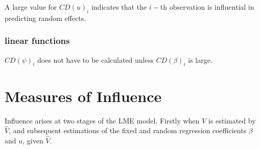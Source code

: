 \documentclass[12pt, a4paper]{report}
\begin{document}
A large value for $CD(u)_i$ indicates that the $i-$th observation is influential in predicting random effects.

\subsubsection{linear functions}

$CD(\psi)_i$ does not have to be calculated unless $CD(\beta)_i$ is large.







\section{Measures of Influence} %


Influence arises at two stages of the LME model. Firstly when $V$ is estimated by $\hat{V}$, and subsequent
estimations of the fixed and random regression coefficients $\beta$ and $u$, given $\hat{V}$.






\end{document}

